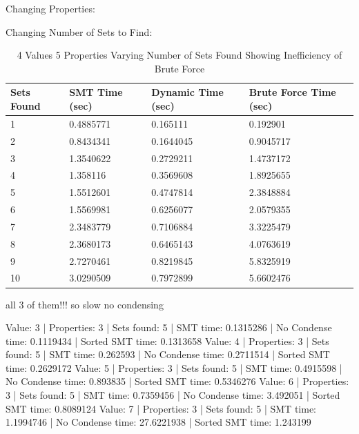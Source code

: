 \documentclass[pageno]{jpaper}
\begin{document}
Changing Properties:


Changing Number of Sets to Find:


\begin{table}[hbt]
  \centering
  \begin{tabular}{|l   |l   |l |l | } \hline
    \textbf{Sets Found} & \textbf{SMT Time (sec)}  & \textbf{Dynamic Time (sec)} & \textbf{Brute Force Time (sec)} \\\hline
1 &	0.4885771 & 0.165111 & 0.192901 \\ \hline 
2&	0.8434341 & 0.1644045 & 0.9045717\\ \hline 
3&	1.3540622 & 0.2729211 & 1.4737172\\ \hline 
4&	1.358116 & 0.3569608 & 1.8925655\\ \hline 
5&	1.5512601 & 0.4747814 & 2.3848884\\ \hline 
6&	1.5569981 & 0.6256077 & 2.0579355\\ \hline 
7&	2.3483779 & 0.7106884 & 3.3225479\\ \hline 
8&	2.3680173 & 0.6465143 & 4.0763619\\ \hline 
9&	2.7270461 & 0.8219845 & 5.8325919\\ \hline 
10&	3.0290509 & 0.7972899 & 5.6602476\\ \hline                       
  \end{tabular}
  \caption{4 Values 5 Properties Varying Number of Sets Found Showing Inefficiency of Brute Force}
  \label{table:data}
\end{table}











all 3 of them!!! so slow no condensing

Value: 3 | Properties: 3 | Sets found: 5 | SMT time: 0.1315286 | No Condense time: 0.1119434 | Sorted SMT time: 0.1313658
Value: 4 | Properties: 3 | Sets found: 5 | SMT time: 0.262593 | No Condense time: 0.2711514 | Sorted SMT time: 0.2629172
Value: 5 | Properties: 3 | Sets found: 5 | SMT time: 0.4915598 | No Condense time: 0.893835 | Sorted SMT time: 0.5346276
Value: 6 | Properties: 3 | Sets found: 5 | SMT time: 0.7359456 | No Condense time: 3.492051 | Sorted SMT time: 0.8089124
Value: 7 | Properties: 3 | Sets found: 5 | SMT time: 1.1994746 | No Condense time: 27.6221938 | Sorted SMT time: 1.243199
\end{document}
